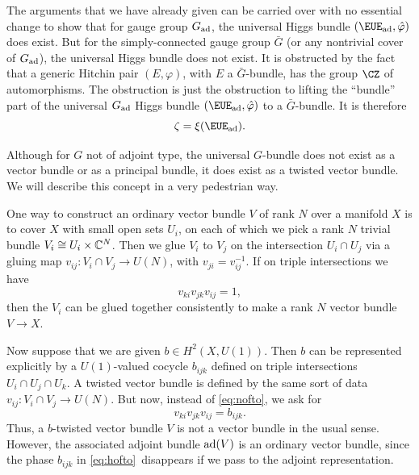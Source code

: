 The arguments that we have already given can be carried over with
no essential change to show that for gauge group $G_{\rm{ad}}$,
the universal Higgs bundle $( {\EUE}_{\rm {ad}},\hat\varphi)$ does
exist. But for the simply-connected gauge group $\bar G$ (or any
nontrivial cover of $G_{\rm {ad}}$), the universal Higgs bundle
does not exist. It is obstructed by the fact that a generic
Hitchin pair $(E,\varphi)$, with $E$  a $\bar G$-bundle, has the
group $\CZ$ of automorphisms. The obstruction is just the
obstruction to lifting the ``bundle'' part of the universal
$G_{{\rm ad}}$ Higgs bundle $({\EUE}_{\rm{ad}},\hat\varphi)$ to a
$\bar G$-bundle. It is therefore
\setcounter{equation}{12}
\begin{equation}\label{eq:plooo}
\zeta=\xi({\EUE}_{\rm{ad}}).
\end{equation}

\par{}

Although for $G$ not of adjoint type, the universal $G$-bundle
does not exist as a vector bundle or as a principal bundle, it
does exist as a twisted vector bundle.  We will describe this
concept in a very pedestrian way.

 One way to construct an ordinary vector
bundle $V$ of rank $N$ over a manifold $X$ is to cover $X$ with
small open sets $U_i$, on each of which we pick a rank $N$ trivial
bundle $V_i\cong U_i\times \Bbb{C}^N$. Then we glue $V_i$ to $V_j$
on the intersection $U_i\cap U_j$ via a gluing map $v_{ij}:V_i\cap
V_j\to U(N)$, with $v_{ji}=v_{ij}^{-1}$. If on triple
intersections we have %
\setcounter{equation}{13}
\begin{equation}\label{eq:nofto}
v_{ki}v_{jk}v_{ij}=1,
\end{equation}
 then the
$V_i$ can be glued together consistently to make a rank $N$ vector
bundle $V\to X$.

Now suppose that we are given $b\in H^2(X,U(1))$.  Then $b$ can be
represented explicitly by a $U(1)$-valued cocycle $b_{ijk}$
defined on triple intersections $U_i\cap U_j\cap U_k$. A twisted
vector bundle is defined by the same sort of data $v_{ij}:V_i\cap
V_j\to U(N)$.  But now, instead of \eqref{eq:nofto}, we ask for
\setcounter{equation}{14}
\begin{equation}\label{eq:hofto}
v_{ki}v_{jk}v_{ij}=b_{ijk}.
\end{equation}
 Thus, a $b$-twisted vector
bundle $V$ is not a vector bundle in the usual sense.  However,
the associated adjoint bundle ${\rm ad}(V)$ is an ordinary vector
bundle, since the phase $b_{ijk}$ in \eqref{eq:hofto}\ disappears if we pass
to the adjoint representation.

